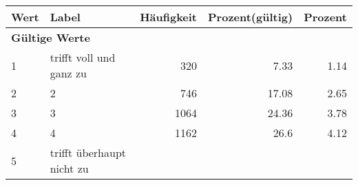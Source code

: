      \begin{longtable}{lXrrr}
     \toprule
     \textbf{Wert} & \textbf{Label} & \textbf{Häufigkeit} & \textbf{Prozent(gültig)} & \textbf{Prozent} \\
     \endhead
     \midrule
     \multicolumn{5}{l}{\textbf{Gültige Werte}}\\

     1 &
     \multicolumn{1}{X}{ trifft voll und ganz zu   } &


       \num{320} &
       \num[round-mode=places,round-precision=2]{7,33} &
         \num[round-mode=places,round-precision=2]{1,14} \\

     2 &
     \multicolumn{1}{X}{ 2   } &


       \num{746} &
       \num[round-mode=places,round-precision=2]{17,08} &
         \num[round-mode=places,round-precision=2]{2,65} \\

     3 &
     \multicolumn{1}{X}{ 3   } &


       \num{1064} &
       \num[round-mode=places,round-precision=2]{24,36} &
         \num[round-mode=places,round-precision=2]{3,78} \\

     4 &
     \multicolumn{1}{X}{ 4   } &


       \num{1162} &
       \num[round-mode=places,round-precision=2]{26,6} &
         \num[round-mode=places,round-precision=2]{4,12} \\

     5 &
     \multicolumn{1}{X}{ trifft überhaupt nicht zu   } &



\end{longtable}
